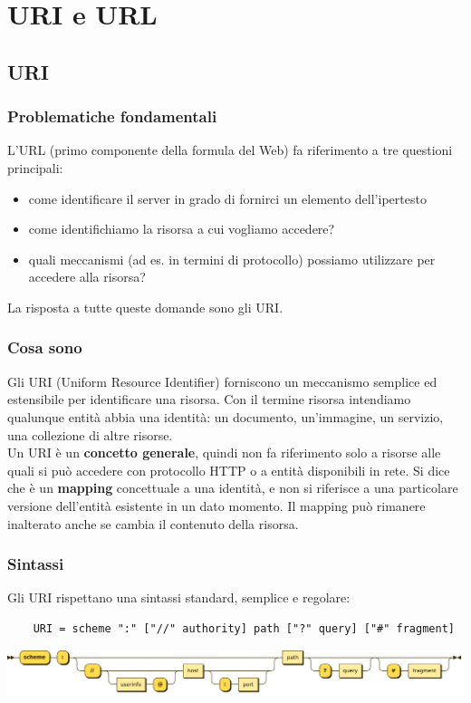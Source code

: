 \documentclass{article}
\begin{document}
\section{URI e URL}
\subsection{URI}
\subsubsection{Problematiche fondamentali}
L'URL (primo componente della formula del Web) fa riferimento a tre questioni principali:
\begin{itemize}
    \item come identificare il server in grado di fornirci un elemento dell'ipertesto
    \item come identifichiamo la risorsa a cui vogliamo accedere?
    \item quali meccanismi (ad es. in termini di protocollo) possiamo utilizzare per accedere alla risorsa?
\end{itemize}
La risposta a tutte queste domande sono gli URI.


\subsubsection{Cosa sono}
Gli URI (Uniform Resource Identifier) forniscono un meccanismo semplice ed estensibile per identificare una risorsa. Con il termine risorsa intendiamo qualunque entità abbia una identità: un documento, un'immagine, un servizio, una collezione di altre risorse.
\vspace*{0.2cm}\\
Un URI è un \textbf{concetto generale}, quindi non fa riferimento solo a risorse alle quali si può accedere con protocollo HTTP o a entità disponibili in rete. Si dice che è un \textbf{mapping} concettuale a una identità, e non si riferisce a una particolare versione dell'entità esistente in un dato momento. Il mapping può rimanere inalterato anche se cambia il contenuto della risorsa.


\subsubsection{Sintassi}
Gli URI rispettano una sintassi standard, semplice e regolare:
\begin{verbatim}
    URI = scheme ":" ["//" authority] path ["?" query] ["#" fragment]
\end{verbatim}
\begin{center}
    \includegraphics[scale=0.19]{Images/URI_diagram.png}
\end{center}
\end{document}
